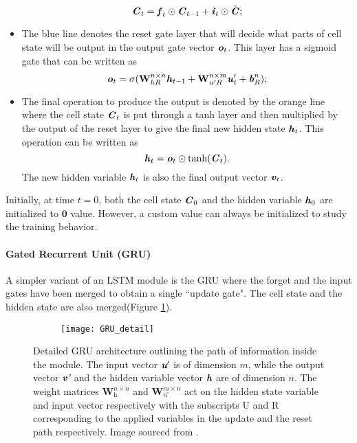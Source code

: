 \begin{itemize}
	\begin{equation}\label{app-lstm-4}
	\textbf{\textit{C}}_t = \textbf{\textit{f}}_t\odot\textbf{\textit{C}}_{t-1}+\textbf{\textit{i}}_t\odot\tilde{\textbf{\textit{C}}};
	\end{equation}
	\item The blue line denotes the reset gate layer that will decide what parts of cell state will be output in the output gate vector $ \textbf{\textit{o}}_t $. This layer has a sigmoid gate that can be written as
	\begin{equation}\label{app-lstm-5}
	\textbf{\textit{o}}_t=\sigma(\textbf{W}^{n\times n}_{hR}\textbf{\textit{h}}_{t-1}+\textbf{W}^{n\times m}_{u'R}\textbf{\textit{u}}'_{t}+\textbf{\textit{b}}^n_{R});
	\end{equation}
	\item The final operation to produce the output is denoted by the orange line where the cell state $ \textbf{\textit{C}}_t $ is put through a tanh layer and then multiplied by the output of the reset layer to give the final new hidden state $ \textbf{\textit{h}}_t $. This operation can be written as 
	\begin{equation}\label{app-lstm-6}
	\textbf{\textit{h}}_t=\textbf{\textit{o}}_t\odot\tanh(\textbf{\textit{C}}_t). 
	\end{equation}
	The new hidden variable $ \textbf{\textit{h}}_t $ is also the final output vector $ \textbf{\textit{v}}_t $.
\end{itemize}

Initially, at time $ t=0 $, both the cell state $ \textbf{\textit{C}}_0 $ and the hidden variable $ \textbf{\textit{h}}_0 $ are initialized to $ \bm0 $ value. However, a custom value can always be initialized to study the training behavior.

\paragraph*{Gated Recurrent Unit (GRU)} A simpler variant of an LSTM module is the GRU where the forget and the input gates have been merged to obtain a single ``update gate". The cell state and the hidden state are also merged\cite{choLearningPhraseRepresentations2014}(Figure \ref{app-lstm-gru}).

\begin{figure}
	\centering
	\begin{subfigure}{0.98\textwidth}
		\texttt{[image: GRU\_detail]}
	\end{subfigure}
	\caption{Detailed GRU architecture outlining the path of information inside the module. The input vector $ \textit{\textbf{u}}' $ is of dimension $ m $, while the output vector $ \textit{\textbf{v}'} $ and the hidden variable vector $ \textit{\textbf{h}} $ are of dimension $ n $. The weight matrices $ \textbf{W}^{n\times n}_\text{h} $ and $ \textbf{W}^{m\times n}_\text{u'} $ act on the hidden state variable and input vector respectively with the subscripts U and R corresponding to the applied variables in the update and the reset path respectively. Image sourced from \cite{wuRecurrentNeuralNetworkaccelerated2020}.}\label{app-lstm-gru}
\end{figure}

